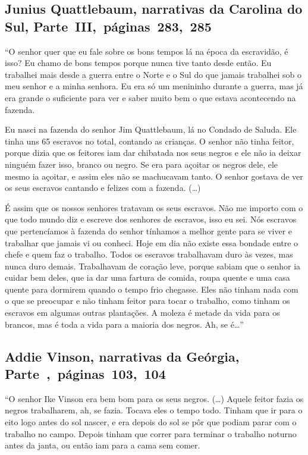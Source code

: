 \subsection{Junius Quattlebaum, narrativas da Carolina do Sul, Parte~III,~páginas~283,~285}
\label{ref220}

``O senhor quer que eu fale sobre os bons tempos lá na época da
escravidão, é isso? Eu chamo de bons tempos porque nunca tive tanto
desde então. Eu trabalhei mais desde a guerra entre o Norte e o Sul do
que jamais trabalhei sob o meu senhor e a minha senhora. Eu era só um
menininho durante a guerra, mas já era grande o suficiente para ver e
saber muito bem o que estava acontecendo na fazenda.

Eu nasci na fazenda do senhor Jim Quattlebaum, lá no Condado de Saluda.
Ele tinha uns 65 escravos no total, contando as crianças. O senhor não
tinha feitor, porque dizia que os feitores iam dar chibatada nos seus
negros e ele não ia deixar ninguém fazer isso, branco ou negro. Se era
para açoitar os negros dele, ele mesmo ia açoitar, e assim eles não se
machucavam tanto. O senhor gostava de ver os seus escravos cantando e
felizes com a fazenda. (\ldots{})

É assim que os nossos senhores tratavam os seus escravos. Não me importo
com o que todo mundo diz e escreve dos senhores de escravos, isso eu
sei. Nós escravos que pertencíamos à fazenda do senhor tínhamos a melhor
gente para se viver e trabalhar que jamais vi ou conheci. Hoje em dia
não existe essa bondade entre o chefe e quem faz o trabalho. Todos os
escravos trabalhavam duro às vezes, mas nunca duro demais. Trabalhavam
de coração leve, porque sabiam que o senhor ia cuidar bem deles, que ia
dar uma fartura de comida, roupa quente e uma casa quente para dormirem
quando o tempo frio chegasse. Eles não tinham nada com o que se
preocupar e não tinham feitor para tocar o trabalho, como tinham os
escravos em algumas outras plantações. A moleza é metade da vida para os
brancos, mas é toda a vida para a maioria dos negros. Ah, se é\ldots{}''

\subsection{Addie Vinson, narrativas da Geórgia, Parte~,~páginas~103,~104}
\label{ref269}

``O senhor Ike Vinson era bem bom para os seus negros. (\ldots{}) Aquele
feitor fazia os negros trabalharem, ah, se fazia. Tocava eles o tempo
todo. Tinham que ir para o eito logo antes do sol nascer, e era depois
do sol se pôr que podiam parar com o trabalho no campo. Depois tinham
que correr para terminar o trabalho noturno antes da janta, ou então iam
para a cama sem comer.

